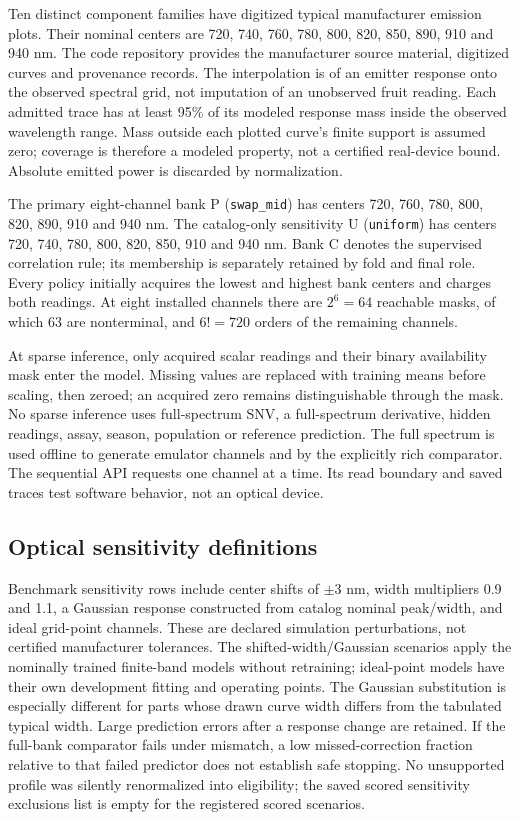 \documentclass[10pt,a4paper]{article}
\begin{document}
Ten distinct component families have digitized typical manufacturer emission plots.\citep{roithnercatalog} Their nominal centers are 720, 740, 760, 780, 800, 820, 850, 890, 910 and 940 nm. The code repository provides the manufacturer source material, digitized curves and provenance records. The interpolation is of an emitter response onto the observed spectral grid, not imputation of an unobserved fruit reading. Each admitted trace has at least 95\% of its modeled response mass inside the observed wavelength range. Mass outside each plotted curve's finite support is assumed zero; coverage is therefore a modeled property, not a certified real-device bound. Absolute emitted power is discarded by normalization.

The primary eight-channel bank P (\texttt{swap\_mid}) has centers 720, 760, 780, 800, 820, 890, 910 and 940 nm. The catalog-only sensitivity U (\texttt{uniform}) has centers 720, 740, 780, 800, 820, 850, 910 and 940 nm. Bank C denotes the supervised correlation rule; its membership is separately retained by fold and final role. Every policy initially acquires the lowest and highest bank centers and charges both readings. At eight installed channels there are $2^6=64$ reachable masks, of which 63 are nonterminal, and $6!=720$ orders of the remaining channels.

At sparse inference, only acquired scalar readings and their binary availability mask enter the model. Missing values are replaced with training means before scaling, then zeroed; an acquired zero remains distinguishable through the mask. No sparse inference uses full-spectrum SNV, a full-spectrum derivative, hidden readings, assay, season, population or reference prediction. The full spectrum is used offline to generate emulator channels and by the explicitly rich comparator. The sequential API requests one channel at a time. Its read boundary and saved traces test software behavior, not an optical device.

\subsection{Optical sensitivity definitions}
Benchmark sensitivity rows include center shifts of $\pm3$ nm, width multipliers 0.9 and 1.1, a Gaussian response constructed from catalog nominal peak/width, and ideal grid-point channels. These are declared simulation perturbations, not certified manufacturer tolerances. The shifted-width/Gaussian scenarios apply the nominally trained finite-band models without retraining; ideal-point models have their own development fitting and operating points. The Gaussian substitution is especially different for parts whose drawn curve width differs from the tabulated typical width. Large prediction errors after a response change are retained. If the full-bank comparator fails under mismatch, a low missed-correction fraction relative to that failed predictor does not establish safe stopping. No unsupported profile was silently renormalized into eligibility; the saved scored sensitivity exclusions list is empty for the registered scored scenarios.
\end{document}
